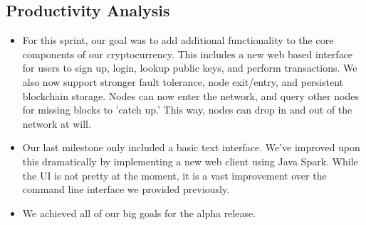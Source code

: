 \documentclass[a4paper,12pt]{article}
\begin{document}
\subsection{Productivity Analysis}
\begin{itemize}
\item For this sprint, our goal was to add additional functionality to the core components of our cryptocurrency. This includes a new web based interface for users to sign up, login, lookup public keys, and perform transactions. We also now support stronger fault tolerance, node exit/entry, and persistent blockchain storage. Nodes can now enter the network, and query other nodes for missing blocks to 'catch up.' This way, nodes can drop in and out of the network at will.
\item Our last milestone only included a basic text interface. We've improved upon this dramatically by implementing a new web client using Java Spark. While the UI is not pretty at the moment, it is a vast improvement over the command line interface we provided previously.
\item We achieved all of our big goals for the alpha release.
\end{itemize}
\end{document}
